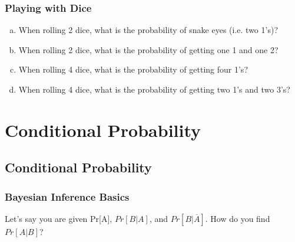 \documentclass[9pt]{beamer}
\begin{document}
\begin{frame}[fragile]
  \frametitle{Playing with Dice}
\begin{enumerate}[(a)]
\item When rolling 2 dice, what is the probability of snake eyes (i.e. two 1's)?
\\ \vspace{5.0mm}
\item When rolling 2 dice, what is the probability of getting one 1 and one 2?
\\ \vspace{5.0mm}
\item When rolling 4 dice, what is the probability of getting four 1's?
\\ \vspace{5.0mm}
\item When rolling 4 dice, what is the probability of getting two 1's and two 3's?
\end{enumerate}
\end{frame}

\section{Conditional Probability}
  \subsection{Conditional Probability}

\begin{frame}
  \frametitle{Bayesian Inference Basics}
Let's say you are given Pr[A], $Pr[B|A]$, and $Pr[B|\overline{A}]$. How do you find $Pr[A|B]$?
\end{frame}
\end{document}
